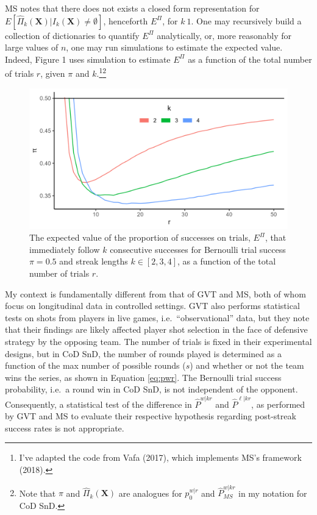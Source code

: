 \documentclass{article}
\begin{document}
MS notes that there does not exists a closed form representation for
\(E[\hat{\Pi}_k(\mathbf{X}) | I_k(\mathbf{X}) \neq \emptyset]\),
henceforth \(E^\Pi\), for \(k \> 1\). One may recursively build a
collection of dictionaries to quantify \(E^\Pi\) analytically, or, more
reasonably for large values of \(n\), one may run simulations to
estimate the expected value. Indeed, Figure 1 uses simulation to
estimate \(E^\Pi\) as a function of the total number of trials \(r\),
given \(\pi\) and \(k\).\footnote{I've adapted the code from Vafa
  (2017), which implements MS's framework (2018).}\footnote{Note that
  \(\pi\) and \(\hat{\Pi}_k(\mathbf{X})\) are analogues for
  \(p_0^{w|r}\) and \(\hat{P}^{w|kr}_{MS}\) in my notation for CoD SnD.}

\begin{figure}
\centering
\includegraphics{images/pwkr_ms.png}
\caption{The expected value of the proportion of successes on trials, $E^\Pi$, that immediately follow $k$ consecutive successes for Bernoulli trial success $\pi = 0.5$ and streak lengths $k \in [2, 3, 4]$, as a function of the total number of trials $r$.}
\end{figure}

My context is fundamentally different from that of GVT and MS, both of
whom focus on longitudinal data in controlled settings. GVT also
performs statistical tests on shots from players in live games,
i.e.~``observational'' data, but they note that their findings are
likely affected player shot selection in the face of defensive strategy
by the opposing team. The number of trials is fixed in their
experimental designs, but in CoD SnD, the number of rounds played is
determined as a function of the max number of possible rounds (\(s\))
and whether or not the team wins the series, as shown in Equation
\ref{eq:pwr}. The Bernoulli trial success probability, i.e.~a round win
in CoD SnD, is not independent of the opponent. Consequently, a
statistical test of the difference in \(\hat{P}^{w|kr}\) and
\(\hat{P}^{\ell|kr}\), as performed by GVT and MS to evaluate their
respective hypothesis regarding post-streak success rates is not
appropriate.
\end{document}
